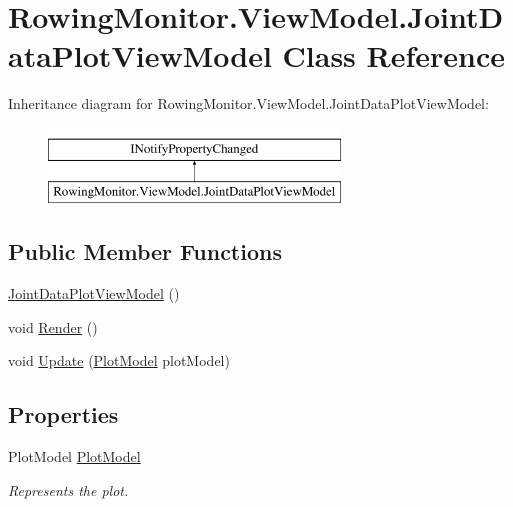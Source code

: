\hypertarget{class_rowing_monitor_1_1_view_model_1_1_joint_data_plot_view_model}{}\section{Rowing\+Monitor.\+View\+Model.\+Joint\+Data\+Plot\+View\+Model Class Reference}
\label{class_rowing_monitor_1_1_view_model_1_1_joint_data_plot_view_model}
Inheritance diagram for Rowing\+Monitor.\+View\+Model.\+Joint\+Data\+Plot\+View\+Model\+:\begin{figure}[H]
\begin{center}
\leavevmode
\includegraphics[height=2.000000cm]{class_rowing_monitor_1_1_view_model_1_1_joint_data_plot_view_model}
\end{center}
\end{figure}
\subsection*{Public Member Functions}
\begin{DoxyCompactItemize}
\item 
\hyperlink{class_rowing_monitor_1_1_view_model_1_1_joint_data_plot_view_model_a0617e5a1a406a41c3c0c0efb38fc4544}{Joint\+Data\+Plot\+View\+Model} ()
\item 
void \hyperlink{class_rowing_monitor_1_1_view_model_1_1_joint_data_plot_view_model_a7ade73f5c7afaf03a13fdf3839169a96}{Render} ()
\item 
void \hyperlink{class_rowing_monitor_1_1_view_model_1_1_joint_data_plot_view_model_a3b5455dd7cdb0c4309c8fe410d438abe}{Update} (\hyperlink{class_rowing_monitor_1_1_view_model_1_1_joint_data_plot_view_model_a68e8da622523739caafdfb6da1d9d112}{Plot\+Model} plot\+Model)
\end{DoxyCompactItemize}
\subsection*{Properties}
\begin{DoxyCompactItemize}
\item 
Plot\+Model \hyperlink{class_rowing_monitor_1_1_view_model_1_1_joint_data_plot_view_model_a68e8da622523739caafdfb6da1d9d112}{Plot\+Model}
\begin{DoxyCompactList}\small\item\em Represents the plot. \end{DoxyCompactList}\end{DoxyCompactItemize}
